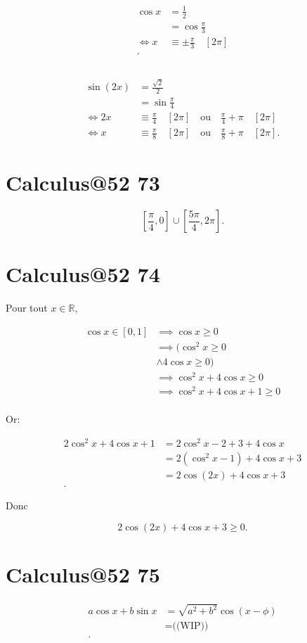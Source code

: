 \documentclass{article}
\newcommand{\R}{\mathbb{R}}
\begin{document}
\subsection{}
\begin{align*}
	\cos x &= \frac{1}{2} \\
	       &= \cos \frac{\pi}{3} \\
	\iff x &\equiv \pm \frac{\pi}{3}\quad[2\pi] \\
.\end{align*}

\subsection{}
\begin{align*}
	\sin(2x) &= \frac{\sqrt{2} }{2}  \\
		 &= \sin \frac{\pi}{4} \\
	\iff 2x &\equiv \frac{\pi}{4} \quad[2\pi]\quad\text{ou}\quad \frac{\pi}{4}+\pi\quad[2\pi]\\
	\iff x &\equiv \frac{\pi}{8}\quad [2\pi] \quad\text{ou}\quad \frac{\pi}{8} + \pi\quad[2\pi] 
.\end{align*}

\section{Calculus@52 73} %

\[
	\left[ \frac{\pi}{4}, 0 \right] \cup \left[ \frac{5\pi}{4}, 2\pi \right]
.\]

\section{Calculus@52 74} %

Pour tout $x \in  \R$, 

\begin{align*}
	\cos x \in [0, 1] &\implies \cos x \ge 0 \\
			  &\implies ( \cos^2x \ge 0 \\
			  &\land 4\cos x \ge 0 ) \\
			  &\implies \cos^2x + 4\cos x \ge 0 \\
			  &\implies \cos^2x + 4\cos x + 1 \ge  0 \\
\end{align*}

Or:

\begin{align*}
	2\cos^2x + 4\cos x + 1 &= 2\cos^2x - 2 + 3 + 4\cos x  \\
			       &= 2(\cos^2x - 1) + 4\cos x + 3  \\
			       &= 2\cos(2x)+4\cos x + 3  \\
.\end{align*}

Donc

\[
	2\cos(2x)+4\cos x + 3 \ge 0
.\] 


\section{Calculus@52 75} %

\begin{align*}
	a\cos x + b\sin x &= \sqrt{a^2+b^2} \cos(x-\phi) \\
			  &= \text{((WIP))} \\
.\end{align*}
\end{document}
